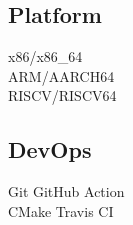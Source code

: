 \documentclass[]{deedy-resume-openfont}
\begin{document}
\begin{minipage}[t]{0.25\textwidth}
\subsection{Platform}
x86/x86\_64 \\
ARM/AARCH64 \\
RISCV/RISCV64 \\
\sectionsep

\subsection{DevOps}
Git \textbullet{} GitHub Action \\
CMake \textbullet{} Travis CI

%
%

\end{minipage} 
\hfill
\end{document}
